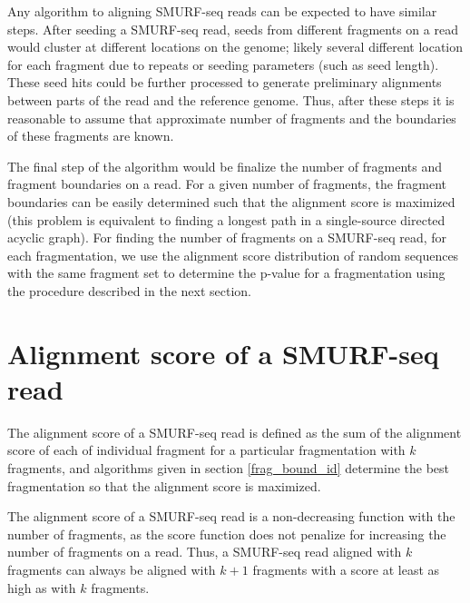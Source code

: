 Any algorithm to aligning SMURF-seq reads can be expected to have
similar steps. After seeding a SMURF-seq read, seeds from different
fragments on a read would cluster at different locations on the genome;
likely several different location for each fragment due to repeats or
seeding parameters (such as seed length).
%
These seed hits could be further processed to generate preliminary
alignments between parts of the read and the reference genome.
%
Thus, after these steps it is reasonable to assume that approximate
number of fragments and the boundaries of these fragments are known.

The final step of the algorithm would be finalize the number of fragments
and fragment boundaries on a read. For a given number of fragments, the
fragment boundaries can be easily determined such that the alignment
score is maximized (this problem is equivalent to finding a longest path
in a single-source directed acyclic graph).
%
For finding the number of fragments on a SMURF-seq read, for each
fragmentation, we use the
alignment score distribution of random sequences with the same
fragment set to determine the p-value for a fragmentation using the
procedure described in the next section.



\section{Alignment score of a SMURF-seq read}
\label{smurf_aln_score}
The alignment score of a SMURF-seq read is defined as the sum of the
alignment score of each of individual fragment for a particular
fragmentation with $k$ fragments, and algorithms given in section
\ref{frag_bound_id} determine the best fragmentation so that the
alignment score is maximized.

The alignment score of a SMURF-seq read is a non-decreasing function
with the number of fragments, as the score function does not penalize
for increasing the number of fragments on a read. Thus, a SMURF-seq read
aligned with $k$ fragments can always be aligned with $k+1$ fragments
with a score at least as high as with $k$ fragments.

